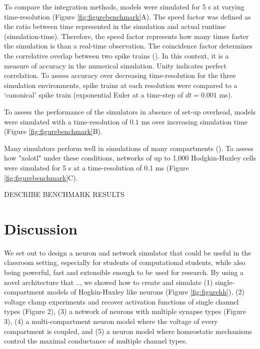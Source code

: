 \documentclass{frontiersSCNS} %
\begin{document}
To compare the integration methods, models were simulated for 5 s at varying time-resolution (Figure \ref{fig:figurebenchmark}A). The speed factor was defined as the ratio between time represented in the simulation and actual runtime (simulation-time). Therefore, the speed factor represents how many times faster the simulation is than a real-time observation. The coincidence factor determines the correlative overlap between two spike trains (\cite{jolivetBenchmarkTestQuantitative2008}). In this context, it is a measure of accuracy in the numerical simulation. Unity indicates perfect correlation. To assess accuracy over decreasing time-resolution for the three simulation environments, spike trains at each resolution were compared to a `canonical' spike train (exponential Euler at a time-step of $dt = 0.001$ ms). 

To assess the performance of the simulators in absence of set-up overhead, models were simulated with a time-resolution of $0.1$ ms over increasing simulation time (Figure \ref{fig:figurebenchmark}B).

Many simulators perform well in simulations of many compartments (\cite{bretteSimulationNetworksSpiking2007, sherfeyDynaSimMATLABToolbox2018, vitayANNarchyCodeGeneration2015, delormeSpikeNETEventdrivenSimulation2003}). To assess how "xolotl" under these conditions, networks of up to 1,000 Hodgkin-Huxley cells were simulated for 5 s at a time-resolution of 0.1 ms (Figure \ref{fig:figurebenchmark}C).

DESCRIBE BENCHMARK RESULTS

%
%
%
%
%
%

\section{Discussion}
\label{discussion}

We set out to design a neuron and network simulator that could be useful in the classroom setting, especially for students of computational students, while also being powerful, fast and extensible enough to be used for research. By using a novel architecture that .., we showed how to create and simulate (1) single-compartment models of Hogkin-Huxley like neurons (Figure \ref{fig:figurehh}), (2) voltage clamp experiments and recover activation functions of single channel types (Figure 2), (3) a network of neurons with multiple synapse types (Figure 3), (4) a multi-compartment neuron model where the voltage of every compartment is coupled, and (5) a neuron model where homeostatic mechanisms control the maximal conductance of multiple channel types. 
\end{document}
